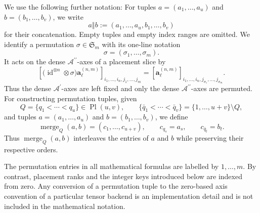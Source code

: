 \documentclass{amsart}
\theoremstyle{definition}
\theoremstyle{remark}
\begin{document}
We use the following further notation: For tuples
$a=(a_1,\ldots,a_u)$ and
$b=(b_1,\ldots,b_v)$, we write
\[
    a\mathbin{\Vert}b
    :=
    (a_1,\ldots,a_u,b_1,\ldots,b_v)
\]
for their concatenation. Empty tuples and empty index ranges are omitted.
We identify a permutation
$\sigma\in\mathfrak{S}_m$ with its one-line notation
\[
    \sigma
    =
    (\sigma_1,\ldots,\sigma_m).
\]
It acts on the dense
$\mathcal{A}^{\prime\prime}$-axes of a placement slice by
\[
    \left[
        \bigl(
            \operatorname{id}^{\otimes n}
            \otimes\sigma
        \bigr)
        \mathbf{a}^{(n,m)}_\ell
    \right]_{
        i_1,\ldots,i_n,j_1,\ldots,j_m
    }
    =
    \left[
        \mathbf{a}^{(n,m)}_\ell
    \right]_{
        i_1,\ldots,i_n,
        j_{\sigma_1},\ldots,j_{\sigma_m}
    }.
\]
Thus the dense $\mathcal{A}^{\prime}$-axes are left fixed and only the
dense $\mathcal{A}^{\prime\prime}$-axes are permuted.
For constructing permutation tuples, given
\[
    Q=\{q_1<\cdots<q_u\}
    \in
    \operatorname{Pl}(u,v),\qquad \{\bar q_1<\cdots<\bar q_v\}
    =
    \{1,\ldots,u+v\}\setminus Q,
\]
and tuples
$a=(a_1,\ldots,a_u)$ and
$b=(b_1,\ldots,b_v)$, we define
\[
    \operatorname{merge}_{Q}(a,b)
    =
    (c_1,\ldots,c_{u+v}),
    \qquad
    c_{q_s}=a_s,
    \qquad
    c_{\bar q_t}=b_t.
\]
Thus $\operatorname{merge}_{Q}(a,b)$ interleaves the entries of $a$ and
$b$ while preserving their respective orders.

The permutation entries in all mathematical formulas are labelled by
$1,\ldots,m$. By contrast, placement ranks and the integer keys introduced
below are indexed from zero. Any conversion of a permutation tuple to the
zero-based axis convention of a particular tensor backend is an
implementation detail and is not included in the mathematical notation.
\end{document}
